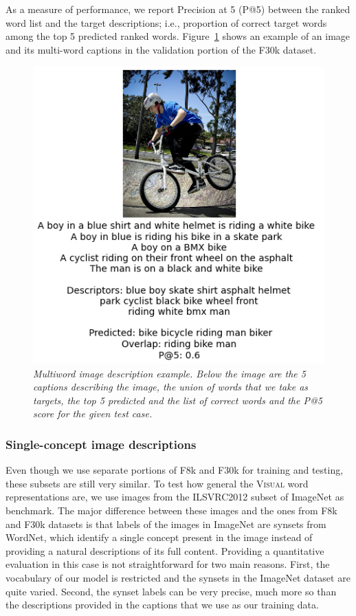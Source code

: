 As a measure of performance, we report Precision at 5 (P@5) between the ranked word list and the target descriptions; i.e., proportion of correct target words among the top 5 predicted ranked words. Figure~\ref{fig:multiword-descriptors} shows an example of an image and its multi-word captions in the validation
portion of the F30k dataset.

\begin{figure}
\centering
\includegraphics[scale=0.45]{chapters/TAL/bikeride}
\caption{\textit{Multiword image description example. Below the image
are the 5 captions describing the image, the union of words
that we take as targets, the top 5 predicted and the list of
correct words and the P@5 score for the given test case.}}
\label{fig:multiword-descriptors}
\end{figure}


\subsubsection{Single-concept image descriptions}
Even though we use separate portions of F8k and F30k for training and
testing, these subsets are still very similar. To test how general the
\textsc{Visual} word representations are, we use images from the ILSVRC2012
subset of ImageNet \cite{ILSVRCarxiv14} as benchmark. The major difference between these
images and the ones from F8k and F30k datasets is that labels of the
images in ImageNet are synsets from WordNet, which identify a single
concept present in the image instead of providing a natural
descriptions of its full content. Providing a quantitative evaluation
in this case is not straightforward for two main reasons. First, the
vocabulary of our model is restricted and the synsets in the ImageNet
dataset are quite varied. Second, the synset labels can be very precise,
much more so than the descriptions provided in the captions that we use
as our training data.

